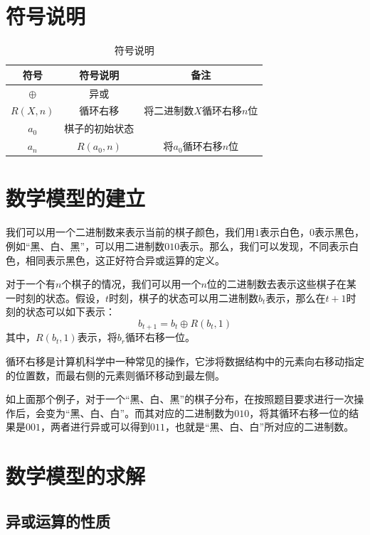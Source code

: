 \documentclass[12pt,AutoFakeSlant,AutoFakeBold]{article}
\newcommand{\nor}{\oplus}
\begin{document}
\section{符号说明}

\begin{table}[h]
    \centering
    \caption{符号说明}
    \begin{tabular}{ccc}
        \toprule
        符号 & 符号说明 & 备注 \\ 
        \midrule
        $\nor$ & 异或 & ~ \\
        $R(X,n)$ & 循环右移 & 将二进制数$X$循环右移$n$位\\
        $a_0$ & 棋子的初始状态 & ~ \\ 
        $a_n$ & $R(a_0,n)$ & 将$a_0$循环右移$n$位
        \\ \bottomrule
    \end{tabular}
\end{table}

\section{数学模型的建立}

我们可以用一个二进制数来表示当前的棋子颜色，我们用$1$表示白色，$0$表示黑色，例如“黑、白、黑”，可以用二进制数$010$表示。那么，我们可以发现，不同表示白色，相同表示黑色，这正好符合异或运算的定义。

对于一个有$n$个棋子的情况，我们可以用一个$n$位的二进制数去表示这些棋子在某一时刻的状态。假设，$t$时刻，棋子的状态可以用二进制数$b_t$表示，那么在$t+1$时刻的状态可以如下表示：
\begin{equation}
    b_{t+1} = b_{t}\nor R(b_{t},1)
\end{equation}
其中，$R(b_{t},1)$表示，将$b_{r}$循环右移一位。

循环右移是计算机科学中一种常见的操作，它涉将数据结构中的元素向右移动指定的位置数，而最右侧的元素则循环移动到最左侧。

如上面那个例子，对于一个“黑、白、黑”的棋子分布，在按照题目要求进行一次操作后，会变为“黑、白、白”。而其对应的二进制数为$010$，将其循环右移一位的结果是$001$，两者进行异或可以得到$011$，也就是“黑、白、白”所对应的二进制数。

\section{数学模型的求解}

\subsection{异或运算的性质}
\end{document}
